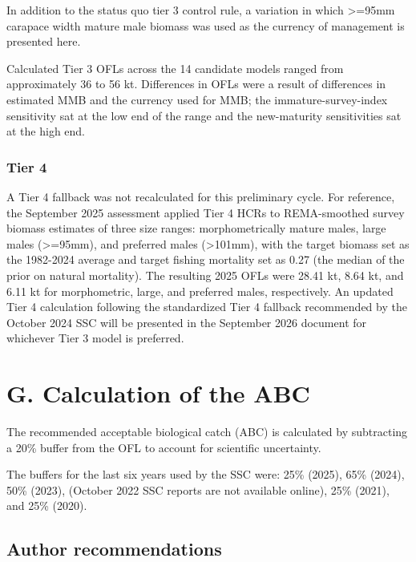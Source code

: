 \documentclass[
]{article}
\begin{document}
In addition to the status quo tier 3 control rule, a variation in which \textgreater=95mm carapace width mature male biomass was used as the currency of management is presented here.

Calculated Tier 3 OFLs across the 14 candidate models ranged from approximately 36 to 56 kt. Differences in OFLs were a result of differences in estimated MMB and the currency used for MMB; the immature-survey-index sensitivity sat at the low end of the range and the new-maturity sensitivities sat at the high end.

\subsubsection{Tier 4}\label{tier-4}

A Tier 4 fallback was not recalculated for this preliminary cycle. For reference, the September 2025 assessment applied Tier 4 HCRs to REMA-smoothed survey biomass estimates of three size ranges: morphometrically mature males, large males (\textgreater=95mm), and preferred males (\textgreater101mm), with the target biomass set as the 1982-2024 average and target fishing mortality set as 0.27 (the median of the prior on natural mortality). The resulting 2025 OFLs were 28.41 kt, 8.64 kt, and 6.11 kt for morphometric, large, and preferred males, respectively. An updated Tier 4 calculation following the standardized Tier 4 fallback recommended by the October 2024 SSC will be presented in the September 2026 document for whichever Tier 3 model is preferred.

\section{G. Calculation of the ABC}\label{g.-calculation-of-the-abc}

The recommended acceptable biological catch (ABC) is calculated by subtracting a 20\% buffer from the OFL to account for scientific uncertainty.

The buffers for the last six years used by the SSC were: 25\% (2025), 65\% (2024), 50\% (2023), (October 2022 SSC reports are not available online), 25\% (2021), and 25\% (2020).

\newpage

\subsection{Author recommendations}\label{author-recommendations}
\end{document}
